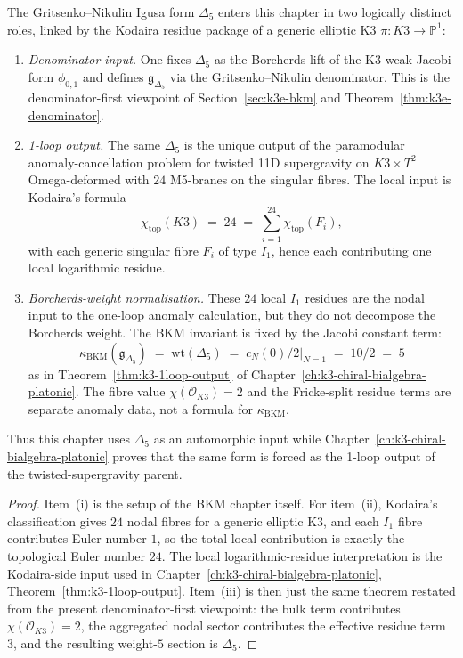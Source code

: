 \begin{proposition}
\label{prop:k3e-one-loop-origin-chapter-header}
The Gritsenko--Nikulin Igusa form $\Delta_5$ enters this chapter in two logically
distinct roles, linked by the Kodaira residue package of a generic elliptic K3
$\pi\colon K3\to \mathbb{P}^1$:
\begin{enumerate}[label=\textup{(\roman*)}]
\item \emph{Denominator input.} One fixes $\Delta_5$ as the Borcherds lift of the K3
weak Jacobi form $\phi_{0,1}$ and defines $\mathfrak{g}_{\Delta_5}$ via the
Gritsenko--Nikulin denominator. This is the denominator-first viewpoint of
Section~\ref{sec:k3e-bkm} and Theorem~\ref{thm:k3e-denominator}.
\item \emph{1-loop output.} The same $\Delta_5$ is the unique output of the
paramodular anomaly-cancellation problem for twisted 11D supergravity on
$K3\times T^2$ Omega-deformed with $24$ M5-branes on the singular fibres. The local
input is Kodaira's formula
\[
 \chi_{\mathrm{top}}(K3)
 \;=\;
 24
 \;=\;
 \sum_{i=1}^{24}\chi_{\mathrm{top}}(F_i),
\]
with each generic singular fibre $F_i$ of type $I_1$, hence each contributing one
local logarithmic residue.
\item \emph{Borcherds-weight normalisation.} These $24$ local $I_1$ residues are
the nodal input to the one-loop anomaly calculation, but they do not decompose
the Borcherds weight. The BKM invariant is fixed by the Jacobi constant term:
\[
 \kappa_{\mathrm{BKM}}(\mathfrak g_{\Delta_5})
 \;=\;
 \mathrm{wt}(\Delta_5)
 \;=\;
 \left.c_N(0)/2\right|_{N=1}
 \;=\;
 10/2
 \;=\;
 5
\]
as in Theorem~\ref{thm:k3-1loop-output} of
Chapter~\ref{ch:k3-chiral-bialgebra-platonic}. The fibre value
$\chi(\mathcal{O}_{K3})=2$ and the Fricke-split residue terms are
separate anomaly data, not a formula for $\kappa_{\mathrm{BKM}}$.
\end{enumerate}
Thus this chapter uses $\Delta_5$ as an automorphic input while Chapter~\ref{ch:k3-chiral-bialgebra-platonic}
proves that the same form is forced as the 1-loop output of the twisted-supergravity
parent.
\end{proposition}

\begin{proof}
Item~\textup{(i)} is the setup of the BKM chapter itself. For item~\textup{(ii)},
Kodaira's classification gives $24$ nodal fibres for a generic elliptic K3, and each
$I_1$ fibre contributes Euler number $1$, so the total local contribution is exactly
the topological Euler number $24$. The local logarithmic-residue interpretation is the
Kodaira-side input used in Chapter~\ref{ch:k3-chiral-bialgebra-platonic},
Theorem~\ref{thm:k3-1loop-output}. Item~\textup{(iii)} is then just the same theorem
restated from the present denominator-first viewpoint: the bulk term contributes
$\chi(\mathcal{O}_{K3})=2$, the aggregated nodal sector contributes the effective
residue term $3$, and the resulting weight-$5$ section is $\Delta_5$.
\end{proof}

